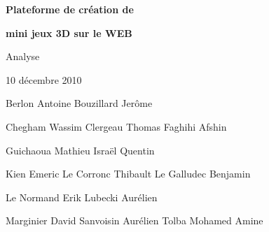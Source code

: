 \documentclass[a4paper,10pt]{article}
\begin{document}
\thispagestyle{empty} 

\vspace{4cm}

\begin{center}
 \textbf{\huge Plateforme de création de}
\end{center}

\begin{center}
 \textbf{\huge mini jeux 3D sur le WEB}
\end{center}

\vspace{0.5cm}

\begin{center}
{\LARGE Analyse}
\end{center}

\vspace{2cm}

\Large
\begin{center}
 10 décembre 2010
\end{center}

\vspace{2cm}


\hspace{2.7cm} Berlon Antoine \hspace{1.9cm} Bouzillard Jerôme 

\vspace{0.2cm}
\noindent
Chegham Wassim \hspace{1.5cm} Clergeau Thomas \hspace{2cm} Faghihi Afshin

\vspace{0.2cm}
\hspace{2.4cm} Guichaoua Mathieu \hspace{1.7cm} Israël Quentin

\vspace{0.2cm}
\hspace{0.1cm} Kien Emeric \hspace{1.6cm} Le Corronc Thibault \hspace{1cm} Le Galludec Benjamin

\vspace{0.2cm}
\noindent
  \hspace{3cm} Le Normand Erik \hspace{1.8cm} Lubecki Aurélien 

\vspace{0.2cm}
\noindent
\hspace{0.1cm} Marginier David \hspace{1.2cm} Sanvoisin Aurélien \hspace{1cm} Tolba Mohamed Amine 
\end{document}
